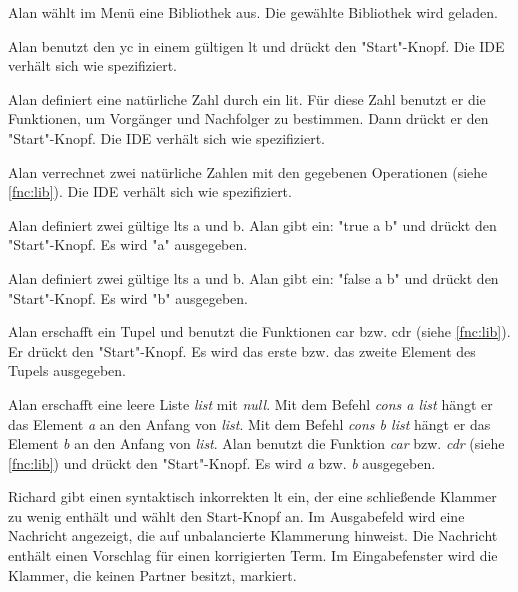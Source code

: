 \documentclass[parskip=full,11pt,twoside]{scrartcl}
\begin{document}

{Alan wählt im Menü eine Bibliothek aus.}
{Die gewählte Bibliothek wird geladen.}

{Alan benutzt den \gls{yc} in einem gültigen \gls{lt} und drückt den "Start"-Knopf.}
{Die IDE verhält sich wie spezifiziert.}

{Alan definiert eine natürliche Zahl durch ein \gls{lit}.
 Für diese Zahl benutzt er die Funktionen, um Vorgänger und Nachfolger zu bestimmen.
 Dann drückt er den "Start"-Knopf.}
{Die IDE verhält sich wie spezifiziert.}

{Alan verrechnet zwei natürliche Zahlen mit den gegebenen Operationen (siehe \ref{fnc:lib}).}
{Die IDE verhält sich wie spezifiziert.}

{Alan definiert zwei gültige \glspl{lt} a und b.
 Alan gibt ein: "true a b" und drückt den "Start"-Knopf.}
{Es wird "a" ausgegeben.}

{Alan definiert zwei gültige \glspl{lt} a und b.
 Alan gibt ein: "false a b" und drückt den "Start"-Knopf.}
{Es wird "b" ausgegeben.}

{Alan erschafft ein Tupel und benutzt die Funktionen car bzw. cdr (siehe \ref{fnc:lib}).
 Er drückt den "Start"-Knopf.}
{Es wird das erste bzw. das zweite Element des Tupels ausgegeben.}

{Alan erschafft eine leere Liste \emph{list} mit \emph{null}. 
 Mit dem Befehl \emph{cons a list} hängt er das Element \emph{a} an den Anfang von \emph{list}.
 Mit dem Befehl \emph{cons b list} hängt er das Element \emph{b} an den Anfang von \emph{list}.
 Alan benutzt die Funktion \emph{car} bzw. \emph{cdr} (siehe \ref{fnc:lib}) und drückt den "Start"-Knopf.}
{Es wird \emph{a} bzw. \emph{b} ausgegeben.}


{Richard gibt einen syntaktisch inkorrekten \gls{lt} ein, der eine schließende Klammer
zu wenig enthält und wählt den Start-Knopf an.}
{Im Ausgabefeld wird eine Nachricht angezeigt, die auf unbalancierte Klammerung hinweist.
Die Nachricht enthält einen Vorschlag für einen korrigierten Term. Im Eingabefenster wird
die Klammer, die keinen Partner besitzt, markiert.}
\end{document}
